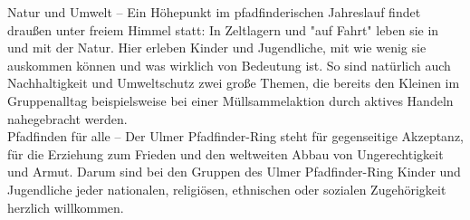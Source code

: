 Natur und Umwelt – Ein Höhepunkt im pfadfinderischen Jahreslauf findet draußen unter freiem Himmel 
statt: In Zeltlagern und "auf Fahrt" leben sie in und mit der Natur. Hier erleben Kinder und 
Jugendliche, mit wie wenig sie auskommen können und was wirklich von Bedeutung ist. So sind 
natürlich auch Nachhaltigkeit und Umweltschutz zwei große Themen, die bereits den Kleinen im 
Gruppenalltag beispielsweise bei einer Müllsammelaktion durch aktives Handeln nahegebracht werden.
\\

Pfadfinden für alle – Der Ulmer Pfadfinder-Ring steht für gegenseitige Akzeptanz, für die Erziehung 
zum Frieden und den weltweiten Abbau von Ungerechtigkeit und Armut. Darum sind bei den Gruppen des 
Ulmer Pfadfinder-Ring Kinder und Jugendliche jeder nationalen, religiösen, ethnischen oder sozialen 
Zugehörigkeit herzlich willkommen.
